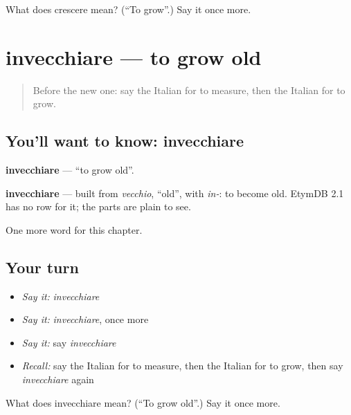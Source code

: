 \begin{tcolorbox}[breakable,colback=teal!4,colframe=teal!35!black,title={Before you move on}]
What does crescere mean? (\textquotedblleft{}To grow\textquotedblright{}.) Say it once more.
\end{tcolorbox}
\section[invecchiare]{invecchiare — to grow old}

\label{lesson:IT-C207-invecchiare}



\begin{quote}
Before the new one: say the Italian for to measure, then the Italian for to grow.
\end{quote}

\subsection*{You'll want to know: invecchiare}
\textbf{invecchiare} — \textquotedblleft{}to grow old\textquotedblright{}.

\begin{cousinweb}
\textbf{invecchiare} — built from \emph{vecchio}, \textquotedblleft{}old\textquotedblright{}, with \emph{in-}: to become old. EtymDB 2.1 has no row for it; the parts are plain to see.
\end{cousinweb}

\begin{grammarlens}[title={What you've built}]
One more word for this chapter.
\end{grammarlens}

\subsection*{Your turn}
\begin{itemize}
\raggedright
  \item \emph{Say it:} \emph{invecchiare}
  \item \emph{Say it:} \emph{invecchiare}, once more
  \item \emph{Say it:} say \emph{invecchiare}
  \item \emph{Recall:} say the Italian for to measure, then the Italian for to grow, then say \emph{invecchiare} again
\end{itemize}

\begin{tcolorbox}[breakable,colback=teal!4,colframe=teal!35!black,title={Before you move on}]
What does invecchiare mean? (\textquotedblleft{}To grow old\textquotedblright{}.) Say it once more.
\end{tcolorbox}
